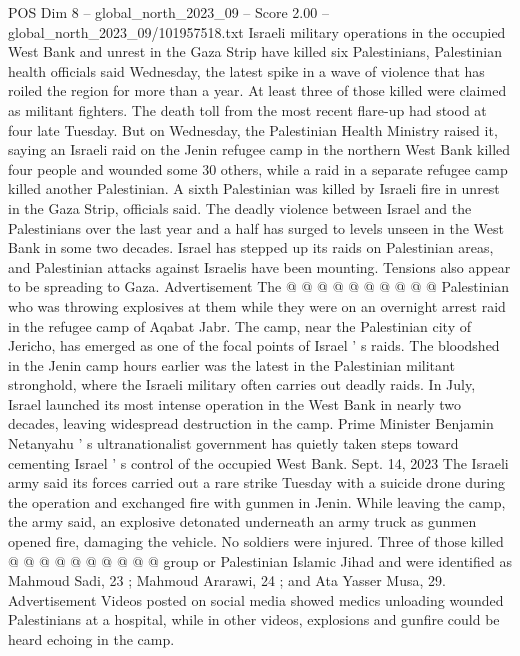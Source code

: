 \begin{textsample}{POS Dim 8 – global\_north\_2023\_09 – Score 2.00 – global\_north\_2023\_09/101957518.txt}  \label{ex:f8_pos_126}
Israeli military operations in the occupied West Bank and unrest in the Gaza Strip have killed six Palestinians, Palestinian health officials said Wednesday, the latest spike in a wave of violence that has roiled the region for more than a year.
At least three of those killed were claimed as militant fighters.
The death toll from the most recent flare-up had stood at four late Tuesday.
But on Wednesday, the Palestinian Health Ministry raised it, saying an Israeli raid on the Jenin refugee camp in the northern West Bank killed four people and wounded some 30 others, while a raid in a separate refugee camp killed another Palestinian.
A sixth Palestinian was killed by Israeli fire in unrest in the Gaza Strip, officials said.
The deadly violence between Israel and the Palestinians over the last year and a half has surged to levels unseen in the West Bank in some two decades.
Israel has stepped up its raids on Palestinian areas, and Palestinian attacks against Israelis have been mounting.
Tensions also appear to be spreading to Gaza.
Advertisement The @ @ @ @ @ @ @ @ @ @ Palestinian who was throwing explosives at them while they were on an overnight arrest raid in the refugee camp of Aqabat Jabr.
The camp, near the Palestinian city of Jericho, has emerged as one of the focal points of Israel ' s raids.
The bloodshed in the Jenin camp hours earlier was the latest in the Palestinian militant stronghold, where the Israeli military often carries out deadly raids.
In July, Israel launched its most intense operation in the West Bank in nearly two decades, leaving widespread destruction in the camp.
Prime Minister Benjamin Netanyahu ' s ultranationalist government has quietly taken steps toward cementing Israel ' s control of the occupied West Bank.
Sept. 14, 2023 The Israeli army said its forces carried out a rare strike Tuesday with a suicide drone during the operation and exchanged fire with gunmen in Jenin.
While leaving the camp, the army said, an explosive detonated underneath an army truck as gunmen opened fire, damaging the vehicle.
No soldiers were injured.
Three of those killed @ @ @ @ @ @ @ @ @ @ group or Palestinian Islamic Jihad and were identified as Mahmoud Sadi, 23 ; Mahmoud Ararawi, 24 ; and Ata Yasser Musa, 29.
Advertisement Videos posted on social media showed medics unloading wounded Palestinians at a hospital, while in other videos, explosions and gunfire could be heard echoing in the camp.

\end{textsample}
